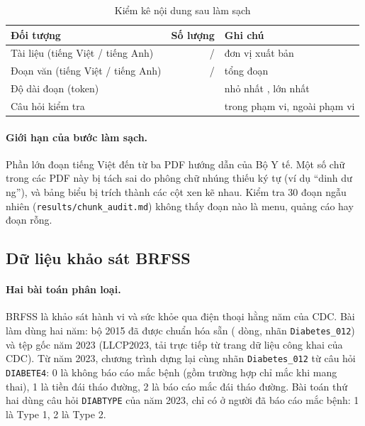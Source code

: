 \documentclass[11pt,a4paper]{article}
\begin{document}
\begin{table}[H]
\centering
\caption{Kiểm kê nội dung sau làm sạch}
\begin{tabular}{lrl}
\toprule
Đối tượng & Số lượng & Ghi chú \\
\midrule
Tài liệu (tiếng Việt / tiếng Anh) & \nDocsVi{} / \nDocsEn{} & \nPublishers{} đơn vị xuất bản \\
Đoạn văn (tiếng Việt / tiếng Anh) & \nChunksVi{} / \nChunksEn{} & tổng \nChunks{} đoạn \\
Độ dài đoạn (token) & \tokMean{} & nhỏ nhất \tokMin{}, lớn nhất \tokMax{} \\
Câu hỏi kiểm tra & \nQuestions{} & \nInScope{} trong phạm vi, \nOos{} ngoài phạm vi \\
\bottomrule
\end{tabular}
\end{table}

\paragraph{Giới hạn của bước làm sạch.}
Phần lớn đoạn tiếng Việt đến từ ba PDF hướng dẫn của Bộ Y tế. Một số chữ trong các PDF này bị tách sai do phông
chữ nhúng thiếu ký tự (ví dụ “dinh dư ng”), và bảng biểu bị trích thành các cột xen kẽ nhau. Kiểm tra 30 đoạn ngẫu
nhiên (\texttt{results/chunk\_audit.md}) không thấy đoạn nào là menu, quảng cáo hay đoạn rỗng.

\subsection{Dữ liệu khảo sát BRFSS}

\paragraph{Hai bài toán phân loại.}
BRFSS là khảo sát hành vi và sức khỏe qua điện thoại hằng năm của CDC. Bài làm dùng hai năm:
bộ 2015 đã được chuẩn hóa sẵn (\yFifteentotal{} dòng, nhãn \texttt{Diabetes\_012}) và tệp gốc năm 2023
(LLCP2023, tải trực tiếp từ trang dữ liệu công khai của CDC). Từ năm 2023, chương trình dựng lại cùng nhãn
\texttt{Diabetes\_012} từ câu hỏi \texttt{DIABETE4}: 0 là không báo cáo mắc bệnh (gồm trường hợp chỉ mắc khi mang
thai), 1 là tiền đái tháo đường, 2 là báo cáo mắc đái tháo đường. Bài toán thứ hai dùng câu hỏi \texttt{DIABTYPE}
của năm 2023, chỉ có ở người đã báo cáo mắc bệnh: 1 là Type 1, 2 là Type 2.
\end{document}
